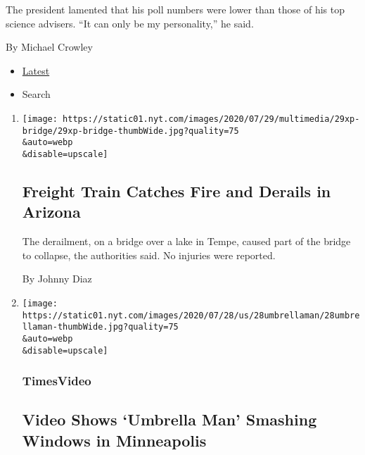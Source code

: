 \begin{enumerate}
  The president lamented that his poll numbers were lower than those of
  his top science advisers. ``It can only be my personality,'' he said.

  By Michael Crowley
\end{enumerate}

\begin{itemize}
\tightlist
\item
  \protect\hyperlink{stream-panel}{Latest}
\item
  Search
\end{itemize}

\begin{enumerate}
\def\labelenumi{\arabic{enumi}.}
\item
  \href{/2020/07/29/us/tempe-train-bridge-fire.html}{}

  \texttt{[image: https://static01.nyt.com/images/2020/07/29/multimedia/29xp-bridge/29xp-bridge-thumbWide.jpg?quality=75\\\&auto=webp\\\&disable=upscale]}

  \hypertarget{freight-train-catches-fire-and-derails-in-arizona}{%
  \subsection{Freight Train Catches Fire and Derails in
  Arizona}\label{freight-train-catches-fire-and-derails-in-arizona}}

  The derailment, on a bridge over a lake in Tempe, caused part of the
  bridge to collapse, the authorities said. No injuries were reported.

  By Johnny Diaz
\item
  \href{/video/us/100000007262407/umbrella-man-minneapolis-video.html}{}

  \texttt{[image: https://static01.nyt.com/images/2020/07/28/us/28umbrellaman/28umbrellaman-thumbWide.jpg?quality=75\\\&auto=webp\\\&disable=upscale]}

  \hypertarget{timesvideo}{%
  \subsubsection{TimesVideo}\label{timesvideo}}

  \hypertarget{video-shows-umbrella-man-smashing-windows-in-minneapolis}{%
  \subsection{Video Shows `Umbrella Man' Smashing Windows in
  Minneapolis}\label{video-shows-umbrella-man-smashing-windows-in-minneapolis}}


\end{enumerate}
